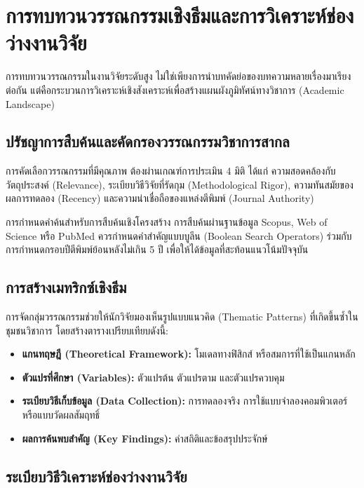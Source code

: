 \chapter{การทบทวนวรรณกรรมเชิงธีมและการวิเคราะห์ช่องว่างงานวิจัย}

การทบทวนวรรณกรรมในงานวิจัยระดับสูง ไม่ใช่เพียงการนำบทคัดย่อของบทความหลายเรื่องมาเรียงต่อกัน แต่คือกระบวนการวิเคราะห์เชิงสังเคราะห์เพื่อสร้างแผนผังภูมิทัศน์ทางวิชาการ (Academic Landscape)

\section{ปรัชญาการสืบค้นและคัดกรองวรรณกรรมวิชาการสากล}

การคัดเลือกวรรณกรรมที่มีคุณภาพ ต้องผ่านเกณฑ์การประเมิน 4 มิติ ได้แก่ ความสอดคล้องกับวัตถุประสงค์ (Relevance), ระเบียบวิธีวิจัยที่รัดกุม (Methodological Rigor), ความทันสมัยของผลการทดลอง (Recency) และความน่าเชื่อถือของแหล่งตีพิมพ์ (Journal Authority)

\begin{teachingplan}{การกำหนดคำค้นสำหรับการสืบค้นเชิงโครงสร้าง}
การสืบค้นผ่านฐานข้อมูล Scopus, Web of Science หรือ PubMed ควรกำหนดคำสำคัญแบบบูลีน (Boolean Search Operators) ร่วมกับการกำหนดกรอบปีตีพิมพ์ย้อนหลังไม่เกิน 5 ปี เพื่อให้ได้ข้อมูลที่สะท้อนแนวโน้มปัจจุบัน
\end{teachingplan}

\section{การสร้างเมทริกซ์เชิงธีม}

การจัดกลุ่มวรรณกรรมช่วยให้นักวิจัยมองเห็นรูปแบบแนวคิด (Thematic Patterns) ที่เกิดขึ้นซ้ำในชุมชนวิชาการ โดยสร้างตารางเปรียบเทียบดังนี้:

\begin{itemize}
    \item \textbf{แกนทฤษฎี (Theoretical Framework):} โมเดลทางฟิสิกส์ หรือสมการที่ใช้เป็นแกนหลัก
    \item \textbf{ตัวแปรที่ศึกษา (Variables):} ตัวแปรต้น ตัวแปรตาม และตัวแปรควบคุม
    \item \textbf{ระเบียบวิธีเก็บข้อมูล (Data Collection):} การทดลองจริง การใช้แบบจำลองคอมพิวเตอร์ หรือแบบวัดผลสัมฤทธิ์
    \item \textbf{ผลการค้นพบสำคัญ (Key Findings):} ค่าสถิติและข้อสรุปประจักษ์
\end{itemize}

\section{ระเบียบวิธีวิเคราะห์ช่องว่างงานวิจัย}

